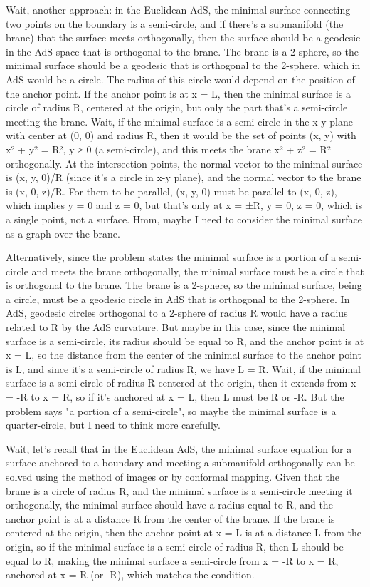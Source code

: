 Wait, another approach: in the Euclidean AdS, the minimal surface connecting two points on the boundary is a semi-circle, and if there's a submanifold (the brane) that the surface meets orthogonally, then the surface should be a geodesic in the AdS space that is orthogonal to the brane. The brane is a 2-sphere, so the minimal surface should be a geodesic that is orthogonal to the 2-sphere, which in AdS would be a circle. The radius of this circle would depend on the position of the anchor point. If the anchor point is at x = L, then the minimal surface is a circle of radius R, centered at the origin, but only the part that's a semi-circle meeting the brane. Wait, if the minimal surface is a semi-circle in the x-y plane with center at (0, 0) and radius R, then it would be the set of points (x, y) with x² + y² = R², y ≥ 0 (a semi-circle), and this meets the brane x² + z² = R² orthogonally. At the intersection points, the normal vector to the minimal surface is (x, y, 0)/R (since it's a circle in x-y plane), and the normal vector to the brane is (x, 0, z)/R. For them to be parallel, (x, y, 0) must be parallel to (x, 0, z), which implies y = 0 and z = 0, but that's only at x = ±R, y = 0, z = 0, which is a single point, not a surface. Hmm, maybe I need to consider the minimal surface as a graph over the brane. 

Alternatively, since the problem states the minimal surface is a portion of a semi-circle and meets the brane orthogonally, the minimal surface must be a circle that is orthogonal to the brane. The brane is a 2-sphere, so the minimal surface, being a circle, must be a geodesic circle in AdS that is orthogonal to the 2-sphere. In AdS, geodesic circles orthogonal to a 2-sphere of radius R would have a radius related to R by the AdS curvature. But maybe in this case, since the minimal surface is a semi-circle, its radius should be equal to R, and the anchor point is at x = L, so the distance from the center of the minimal surface to the anchor point is L, and since it's a semi-circle of radius R, we have L = R. Wait, if the minimal surface is a semi-circle of radius R centered at the origin, then it extends from x = -R to x = R, so if it's anchored at x = L, then L must be R or -R. But the problem says "a portion of a semi-circle", so maybe the minimal surface is a quarter-circle, but I need to think more carefully. 

Wait, let's recall that in the Euclidean AdS, the minimal surface equation for a surface anchored to a boundary and meeting a submanifold orthogonally can be solved using the method of images or by conformal mapping. Given that the brane is a circle of radius R, and the minimal surface is a semi-circle meeting it orthogonally, the minimal surface should have a radius equal to R, and the anchor point is at a distance R from the center of the brane. If the brane is centered at the origin, then the anchor point at x = L is at a distance L from the origin, so if the minimal surface is a semi-circle of radius R, then L should be equal to R, making the minimal surface a semi-circle from x = -R to x = R, anchored at x = R (or -R), which matches the condition. 

